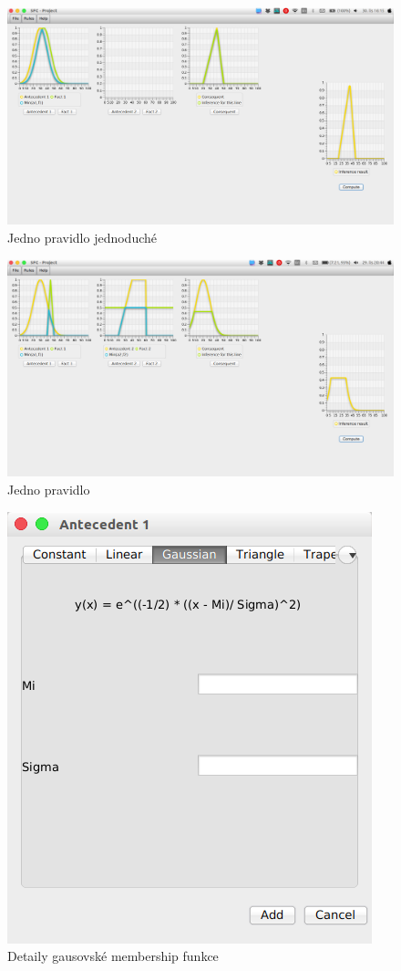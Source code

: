 \documentclass[12pt,a4paper,titlepage]{article}
\begin{document}
\begin{figure}[!htbp]
	\centering
	\includegraphics[scale=0.3]{oneRuleSimple}
	\caption{Jedno pravidlo jednoduché}
	\label{oneRuleSimple}
\end{figure}

\begin{figure}[!htbp]
	\centering
	\includegraphics[scale=0.3]{oneRule}
	\caption{Jedno pravidlo}
	\label{oneRule}
\end{figure}

\begin{figure}[!htbp]
	\centering
	\includegraphics[scale=0.5]{setDetailsGaussian}
	\caption{Detaily gausovské membership funkce}
	\label{setDetailsGaussian}
\end{figure}
\end{document}
